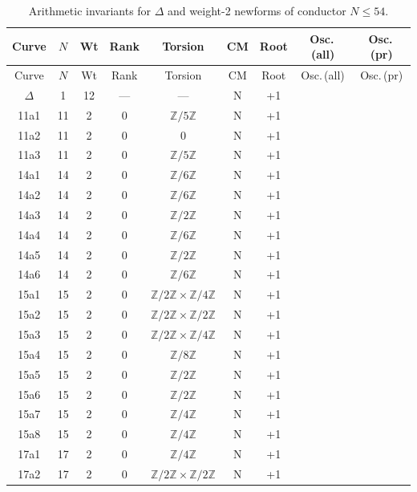 \small
\begin{longtable}{ccccccccc}
\caption{Arithmetic invariants for $\Delta$ and weight-2 newforms of conductor $N \le 54$.} \\
\toprule
Curve & $N$ & Wt & Rank & Torsion & CM & Root & Osc.\,(all) & Osc.\,(pr) \\
\midrule
\endfirsthead
\toprule
Curve & $N$ & Wt & Rank & Torsion & CM & Root & Osc.\,(all) & Osc.\,(pr) \\
\midrule
\endhead
\bottomrule
\endfoot
$\Delta$ & 1 & 12 & --- & --- & N & +1 &  &  \\
11a1 & 11 & 2 & 0 & $\mathbb{Z}/5\mathbb{Z}$ & N & +1 &  &  \\
11a2 & 11 & 2 & 0 & 0 & N & +1 &  &  \\
11a3 & 11 & 2 & 0 & $\mathbb{Z}/5\mathbb{Z}$ & N & +1 &  &  \\
14a1 & 14 & 2 & 0 & $\mathbb{Z}/6\mathbb{Z}$ & N & +1 &  &  \\
14a2 & 14 & 2 & 0 & $\mathbb{Z}/6\mathbb{Z}$ & N & +1 &  &  \\
14a3 & 14 & 2 & 0 & $\mathbb{Z}/2\mathbb{Z}$ & N & +1 &  &  \\
14a4 & 14 & 2 & 0 & $\mathbb{Z}/6\mathbb{Z}$ & N & +1 &  &  \\
14a5 & 14 & 2 & 0 & $\mathbb{Z}/2\mathbb{Z}$ & N & +1 &  &  \\
14a6 & 14 & 2 & 0 & $\mathbb{Z}/6\mathbb{Z}$ & N & +1 &  &  \\
15a1 & 15 & 2 & 0 & $\mathbb{Z}/2\mathbb{Z} \times \mathbb{Z}/4\mathbb{Z}$ & N & +1 &  &  \\
15a2 & 15 & 2 & 0 & $\mathbb{Z}/2\mathbb{Z} \times \mathbb{Z}/2\mathbb{Z}$ & N & +1 &  &  \\
15a3 & 15 & 2 & 0 & $\mathbb{Z}/2\mathbb{Z} \times \mathbb{Z}/4\mathbb{Z}$ & N & +1 &  &  \\
15a4 & 15 & 2 & 0 & $\mathbb{Z}/8\mathbb{Z}$ & N & +1 &  &  \\
15a5 & 15 & 2 & 0 & $\mathbb{Z}/2\mathbb{Z}$ & N & +1 &  &  \\
15a6 & 15 & 2 & 0 & $\mathbb{Z}/2\mathbb{Z}$ & N & +1 &  &  \\
15a7 & 15 & 2 & 0 & $\mathbb{Z}/4\mathbb{Z}$ & N & +1 &  &  \\
15a8 & 15 & 2 & 0 & $\mathbb{Z}/4\mathbb{Z}$ & N & +1 &  &  \\
17a1 & 17 & 2 & 0 & $\mathbb{Z}/4\mathbb{Z}$ & N & +1 &  &  \\
17a2 & 17 & 2 & 0 & $\mathbb{Z}/2\mathbb{Z} \times \mathbb{Z}/2\mathbb{Z}$ & N & +1 &  &  \\

\end{longtable}
